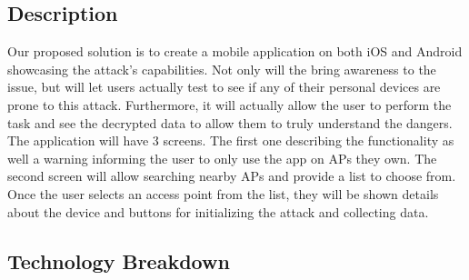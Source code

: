 \documentclass[11pt,]{article}
\begin{document}
\subsection{Description}\label{description}

Our proposed solution is to create a mobile application on both iOS and
Android showcasing the attack's capabilities. Not only will the bring
awareness to the issue, but will let users actually test to see if any
of their personal devices are prone to this attack. Furthermore, it will
actually allow the user to perform the task and see the decrypted data
to allow them to truly understand the dangers. The application will have
3 screens. The first one describing the functionality as well a warning
informing the user to only use the app on APs they own. The second
screen will allow searching nearby APs and provide a list to choose
from. Once the user selects an access point from the list, they will be
shown details about the device and buttons for initializing the attack
and collecting data.

\subsection{Technology Breakdown}\label{technology-breakdown}

\renewcommand\refname{Mockups}

\end{document}
